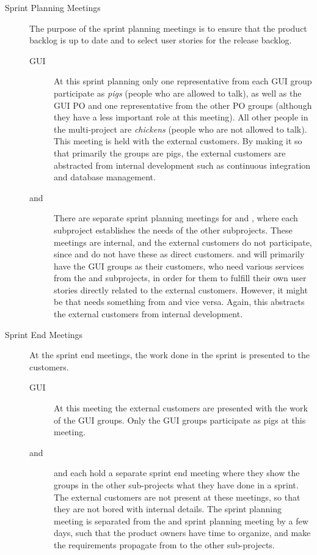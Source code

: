 \begin{description}
  \item[Sprint Planning Meetings]
  The purpose of the sprint planning meetings is to ensure that the product backlog is up to date and to select user stories for the release backlog.
  \begin{description}
    \item[GUI] At this sprint planning only one representative from each GUI group participate as \emph{pigs} (people who are allowed to talk), as well as the GUI PO and one representative from the other PO groups (although they have a less important role at this meeting). All other people in the multi-project are \emph{chickens} (people who are not allowed to talk). This meeting is held with the external customers. By making it so that primarily the \gui groups are pigs, the external customers are abstracted from internal development such as continuous integration and database management.
    \item[\db and \bd] There are separate sprint planning meetings for \db and \bd, where each subproject establishes the needs of the other subprojects. These meetings are internal, and the external customers do not participate, since \db and \bd do not have these as direct customers. \db and \bd will primarily have the GUI groups as their customers, who need various services from the \db and \bd subprojects, in order for them to fulfill their own user stories directly related to the external customers. However, it might be that \db needs something from \bd and vice versa. Again, this abstracts the external customers from internal development.
  \end{description}
  \item[Sprint End Meetings]
  At the sprint end meetings, the work done in the sprint is presented to the customers.
  \begin{description}
    \item[GUI] At this meeting the external customers are presented with the work of the GUI groups. Only the GUI groups participate as pigs at this meeting.
    \item[\db and \bd] \db and \bd each hold a separate sprint end meeting where they show the groups in the other sub-projects what they have done in a sprint. The external customers are not present at these meetings, so that they are not bored with internal details. The \gui sprint planning meeting is separated from the \db and \bd sprint planning meeting by a few days, such that the product owners have time to organize, and make the requirements propagate from \gui to the other sub-projects.  
  \end{description}
\end{description}

